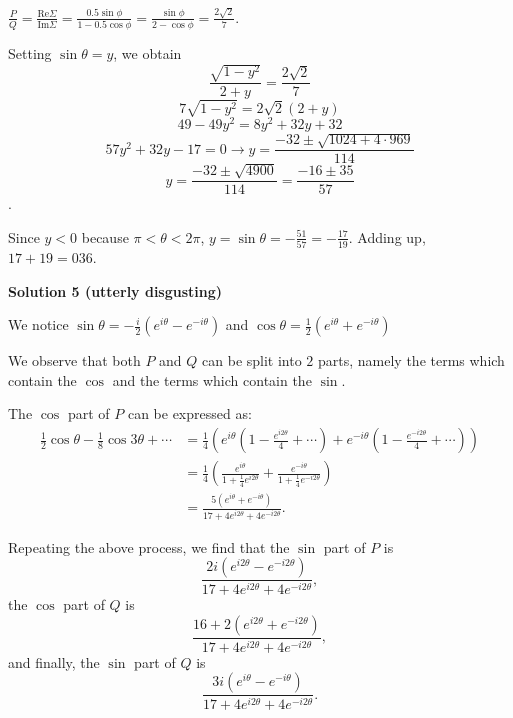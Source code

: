 \begin{enumerate}
 $\frac{P}{Q}=\frac{\text{Re}\Sigma}{\text{Im}\Sigma}=\frac{0.5\sin\phi}{1-0.5\cos\phi}=\frac{\sin\phi}{2-\cos\phi}=\frac{2\sqrt{2}}{7}$.

 Setting $\sin\theta=y$, we obtain
 \[\frac{\sqrt{1-y^2}}{2+y}=\frac{2\sqrt{2}}{7}\]
 \[7\sqrt{1-y^2}=2\sqrt{2}(2+y)\]
 \[49-49y^2=8y^2+32y+32\]
 \[57y^2+32y-17=0\rightarrow y=\frac{-32\pm\sqrt{1024+4\cdot 969}}{114}\]
 \[y=\frac{-32\pm\sqrt{4900}}{114}=\frac{-16\pm 35}{57}\].

 Since $y<0$ because $\pi<\theta<2\pi$, $y=\sin\theta=-\frac{51}{57}=-\frac{17}{19}$. Adding up, $17+19=\boxed{036}$.

 



\textbf{Solution 5 (utterly disgusting)}

We notice $\sin\theta=-\frac{i}{2}(e^{i\theta}-e^{-i\theta})$ and $\cos\theta=\frac{1}{2}(e^{i\theta}+e^{-i\theta})$

 We observe that both $P$ and $Q$ can be split into $2$ parts, namely the terms which contain the $\cos$ and the terms which contain the $\sin .$

 The $\cos$ part of $P$ can be expressed as: 
 \begin{align*}\frac12\cos\theta-\frac18\cos3\theta+\cdots&=\frac14\left(e^{i\theta}\left(1-\frac{e^{i2\theta}}{4}+\cdots\right)+e^{-i\theta}\left(1-\frac{e^{-i2\theta}}{4}+\cdots\right)\right) \\ &= \frac{1}{4}\left(\frac{e^{i\theta}}{1+\frac{1}{4}e^{i2\theta}}+\frac{e^{-i\theta}}{1+\frac{1}{4}e^{-i2\theta}}\right)\\  &= \frac{5(e^{i\theta}+e^{-i\theta})}{17+4e^{i2\theta}+4e^{-i2\theta}}.\end{align*}


 Repeating the above process, we find that the $\sin$ part of $P$ is 
 \[\frac{2i(e^{i2\theta}-e^{-i2\theta})}{17+4e^{i2\theta}+4e^{-i2\theta}},\] the $\cos$ part of $Q$ is 
 \[\frac{16+2(e^{i2\theta}+e^{-i2\theta})}{17+4e^{i2\theta}+4e^{-i2\theta}},\] and finally, the $\sin$ part of $Q$ is 
 \[\frac{3i(e^{i\theta}-e^{-i\theta})}{17+4e^{i2\theta}+4e^{-i2\theta}}.\]


\end{enumerate}
